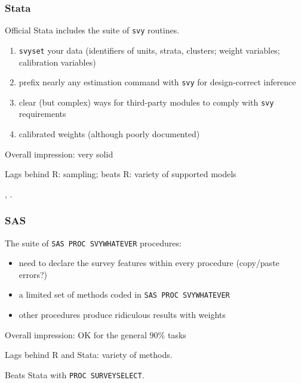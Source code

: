\documentclass[handout]{beamer}
\begin{document}
\begin{frame}\frametitle{Stata}

Official Stata includes the suite of \texttt{svy} routines.

\begin{enumerate}
    \item \texttt{svyset} your data (identifiers of units, strata, clusters; weight variables; calibration variables)
    \item prefix nearly any estimation command with \texttt{svy} for design-correct inference
    \item clear (but complex) ways for third-party modules to comply with \texttt{svy} requirements
    \item calibrated weights (although poorly documented)
\end{enumerate}

Overall impression: very solid

Lags behind R: sampling; beats R: variety of supported models

\medskip

\citet{heeringa:west:berglund:2017}, \citet{kolenikov:pitblado:2014}.

\end{frame}

\begin{frame}\frametitle{SAS}


The suite of \texttt{SAS PROC SVYWHATEVER} procedures:

\begin{itemize}
    \item need to declare the survey features within every procedure (copy/paste errors?)
    \item a limited set of methods coded in \texttt{SAS PROC SVYWHATEVER}
    \item other procedures produce ridiculous results with weights
\end{itemize}

\bigskip

Overall impression: OK for the general 90\% tasks

\bigskip

Lags behind R and Stata: variety of methods.

\medskip

Beats Stata with \texttt{PROC SURVEYSELECT}.

\end{frame}
\end{document}
